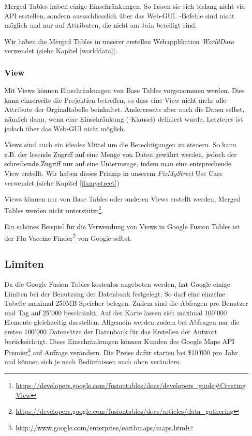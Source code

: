 Merged Tables haben einige Einschränkungen. So lassen sie sich bislang nicht via \gls{API} erstellen, sondern aussschliesslich über das Web-GUI. -Befehle sind nicht möglich und  nur auf Attributen, die nicht am Join beteiligt sind.

Wir haben die Merged Tables in unserer erstellen Webapplikation \emph{WorldData} verwendet (siehe Kapitel \ref{worlddata}).

\subsubsection{View}
Mit Views können Einschränkungen von Base Tables vorgenommen werden. Dies kann einserseits die Projektion betreffen, so dass eine View nicht mehr alle Attribute der Orginaltabelle beinhaltet. Andererseits aber auch die Daten selbst, nämlich dann, wenn eine Einschränkung (-Klausel) definiert wurde. Letzteres ist jedoch über das Web-GUI nicht möglich.

Views sind auch ein ideales Mittel um die Berechtigungen zu steuern. So kann z.B. der lesende Zugriff auf eine Menge von Daten gewährt werden, jedoch der schreibende Zugriff nur auf eine Untermenge, indem man eine entsprechende View erstellt. Wir haben dieses Prinzip in unserem \emph{FixMyStreet} Use Case verwendet (siehe Kapitel \ref{fixmystreet})

Views können nur von Base Tables oder anderen Views erstellt werden, Merged Tables werden nicht unterstützt\footnote{\url{https://developers.google.com/fusiontables/docs/developers_guide\#CreatingView}}.

Ein schönes Beispiel für die Verwendung von Views in Google Fusion Tables ist der Flu Vaccine Finder\footnote{\url{https://developers.google.com/fusiontables/docs/articles/data_gathering}} von Google selbst.

\subsection{Limiten}
Da die Google Fusion Tables kostenlos angeboten werden, hat Google einige Limiten bei der Benutzung der Datenbank festgelegt. So darf eine einzelne Tabelle maximal 250MB Speicher belegen. Zudem sind die Abfragen pro Benutzer und Tag auf 25'000 beschränkt. Auf der Karte lassen sich maximal 100'000 Elemente gleichzeitig darstellen. Allgemein werden zudem bei Abfragen nur die ersten 100'000 Datensätze der Datenbank für das Erstellen der Antwort berücksichtigt. Diese Einschränkungen können Kunden des Google Maps \gls{API} Premier\footnote{\url{http://www.google.com/enterprise/earthmaps/maps.html}} auf Anfrage verändern. Die Preise dafür starten bei \$10'000 pro Jahr und können sich je nach Bedürfnissen nach oben verändern.\cite{fusion-tables-geo-limits}

